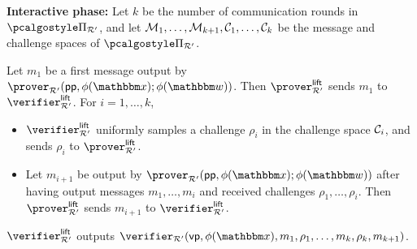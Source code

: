 \documentclass[11pt,letterpaper,usenames,dvipsnames]{article}
\begin{document}
\begin{definition}
\begin{algorithm}[H]
        
          \textbf{Interactive phase:}   Let $k$ be the number of communication rounds  in $\prot_{\R'}$, and let $\mathcal{M}_1, \ldots, \mathcal{M}_{k+1}, \mathcal{C}_1,\ldots, \mathcal{C}_k$ be the message and challenge spaces of $\prot_{\R'}$.
		\begin{algorithmic}[1]
			\STATE Let $m_1$ be a first message output by $\prover_{\R'}(\pp, \phi(\inp);\phi(\wit))$. Then $\prover_{\R'}^{\lift}$ sends $m_1$ to $\verifier_{\R'}^{\lift}$.
            \STATE For $i=1,\ldots, k$,
            \begin{itemize}
                \item $\verifier_{\R'}^{\lift}$ uniformly samples a challenge $\rho_i$ in the challenge space $\mathcal{C}_i$, and sends $\rho_i$ to $\prover_{\R'}^{\lift}$. 
                \item Let $m_{i+1}$ be output by $\prover_{\R'}(\pp,\phi(\inp);\phi(\wit))$ after having output messages $m_1, \ldots, m_{i}$ and received challenges $\rho_{1},\ldots, \rho_{i}$.  Then $\prover_{\R'}^{\lift}$ sends $m_{i+1}$ to $\verifier_{\R'}^{\lift}$. 
            \end{itemize}
            \STATE $\verifier_{\R'}^\lift$ outputs $\verifier_{\R'}(\vp, \phi(\inp), m_1, \rho_1,\ldots, m_k, \rho_{k}, m_{k+1})$. %
		\end{algorithmic}
	\end{algorithm}
          \end{definition}
    

        
        
\end{document}
